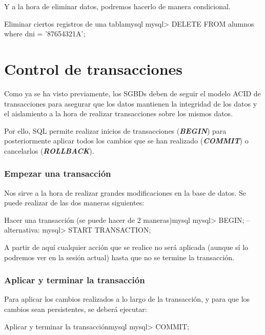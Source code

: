 Y a la hora de eliminar datos, podremos hacerlo de manera condicional.

\begin{mycode}{Eliminar ciertos registros de una tabla}{mysql}{}
mysql> DELETE FROM alumnos where dni = '87654321A';
\end{mycode}

\section{Control de transacciones}
Como ya se ha visto previamente, los SGBDs deben de seguir el modelo ACID de transacciones para asegurar que los datos mantienen la integridad de los datos y el aislamiento a la hora de realizar transacciones sobre los mismos datos.

Por ello, SQL permite realizar inicios de transacciones (\textit{\textbf{BEGIN}}) para posteriormente aplicar todos los cambios que se han realizado (\textit{\textbf{COMMIT}}) o cancelarlos (\textit{\textbf{ROLLBACK}}).




\subsubsection*{Empezar una transacción}
Nos sirve a la hora de realizar grandes modificaciones en la base de datos. Se puede realizar de las dos maneras siguientes:

\begin{mycode}{Hacer una transacción (se puede hacer de 2 maneras)}{mysql}{}
mysql> BEGIN;
-- alternativa:
mysql> START TRANSACTION;
\end{mycode}

A partir de aquí cualquier acción que se realice no será aplicada (aunque sí lo podremos ver en la sesión actual) hasta que no se termine la transacción.

\subsubsection*{Aplicar y terminar la transacción}
Para aplicar los cambios realizados a lo largo de la transacción, y para que los cambios sean persistentes, se deberá ejecutar:

\begin{mycode}{Aplicar y terminar la transacción}{mysql}{}
mysql> COMMIT;
\end{mycode}


